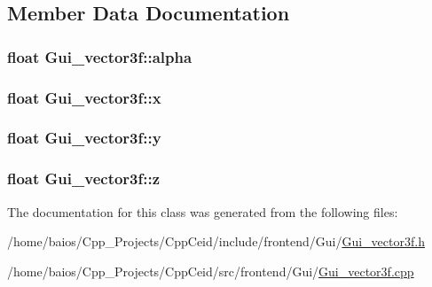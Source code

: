 \subsection{Member Data Documentation}
\hypertarget{class_gui__vector3f_af93c521b147e54d6b50f6612927e5d90}{
\subsubsection[{alpha}]{\setlength{\rightskip}{0pt plus 5cm}float Gui\-\_\-vector3f\-::alpha}}\label{class_gui__vector3f_af93c521b147e54d6b50f6612927e5d90}
\hypertarget{class_gui__vector3f_a023856935269d19fbe9e4e2405c4a330}{
\subsubsection[{x}]{\setlength{\rightskip}{0pt plus 5cm}float Gui\-\_\-vector3f\-::x}}\label{class_gui__vector3f_a023856935269d19fbe9e4e2405c4a330}
\hypertarget{class_gui__vector3f_aeeb2c025e216e05450ccc0516a31339c}{
\subsubsection[{y}]{\setlength{\rightskip}{0pt plus 5cm}float Gui\-\_\-vector3f\-::y}}\label{class_gui__vector3f_aeeb2c025e216e05450ccc0516a31339c}
\hypertarget{class_gui__vector3f_a36f4373054963a96e658d27b00ccc281}{
\subsubsection[{z}]{\setlength{\rightskip}{0pt plus 5cm}float Gui\-\_\-vector3f\-::z}}\label{class_gui__vector3f_a36f4373054963a96e658d27b00ccc281}


The documentation for this class was generated from the following files\-:\begin{DoxyCompactItemize}
\item 
/home/baios/\-Cpp\-\_\-\-Projects/\-Cpp\-Ceid/include/frontend/\-Gui/\hyperlink{_gui__vector3f_8h}{Gui\-\_\-vector3f.\-h}\item 
/home/baios/\-Cpp\-\_\-\-Projects/\-Cpp\-Ceid/src/frontend/\-Gui/\hyperlink{_gui__vector3f_8cpp}{Gui\-\_\-vector3f.\-cpp}\end{DoxyCompactItemize}
